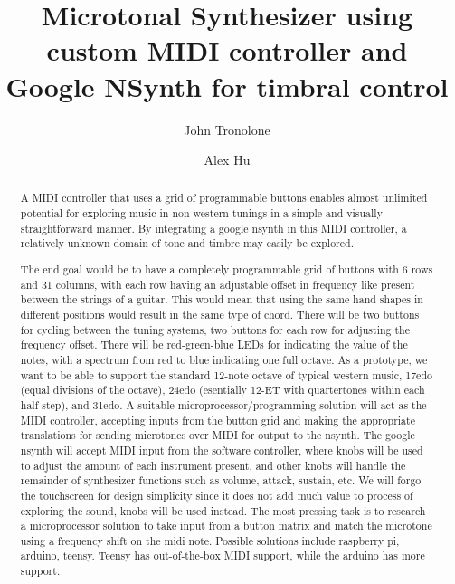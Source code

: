\documentclass{article}
\begin{document}
\title{Microtonal Synthesizer using custom MIDI controller and Google NSynth for timbral control}
\author{John Tronolone\and Alex Hu}
\date{}

\maketitle

\begin{abstract}
A MIDI controller that uses a grid of programmable buttons enables almost unlimited potential for exploring music in non-western tunings in a simple and visually straightforward manner. By integrating a google nsynth in this MIDI controller, a relatively unknown domain of tone and timbre may easily be explored.

The end goal would be to have a completely programmable grid of buttons with 6 rows and 31 columns, with each row having an adjustable offset in frequency like present between the strings of a guitar. This would mean that using the same hand shapes in different positions would result in the same type of chord. There will be two buttons for cycling between the tuning systems, two buttons for each row for adjusting the frequency offset. There will be red-green-blue LEDs for indicating the value of the notes, with a spectrum from red to blue indicating one full octave. As a prototype, we want to be able to support the standard 12-note octave of typical western music, 17edo (equal divisions of the octave), 24edo (esentially 12-ET with quartertones within each half step), and 31edo. A suitable microprocessor/programming solution will act as the MIDI controller, accepting inputs from the button grid and making the appropriate translations for sending microtones over MIDI for output to the nsynth. The google nsynth will accept MIDI input from the software controller, where knobs will be used to adjust the amount of each instrument present, and  other knobs will handle the remainder of synthesizer functions such as volume, attack, sustain, etc. We will forgo the touchscreen for design simplicity since it does not add much value to process of exploring the sound, knobs will be used instead. The most pressing task is to research a microprocessor solution to take input from a button matrix and match the microtone using a frequency shift on the midi note. Possible solutions include raspberry pi, arduino, teensy. Teensy has out-of-the-box MIDI support, while the arduino has more support.

\end{abstract}
\end{document}
